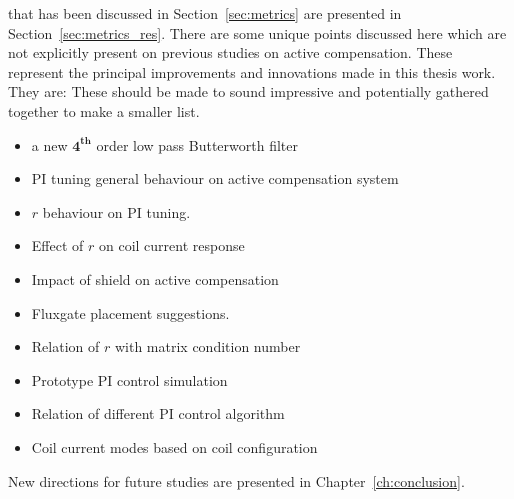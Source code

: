 that has been discussed in Section~\ref{sec:metrics} are presented in
Section~\ref{sec:metrics_res}. There are some unique points discussed
here which are not explicitly present on previous studies on active
compensation. These represent the principal improvements and
innovations made in this thesis work.  They are: {\color{red}These
should be made to sound impressive and potentially gathered together
to make a smaller list.}
\begin{itemize}
    \item a new $\mathbf{4^{th}}$ order low pass Butterworth filter
    \item PI tuning general behaviour on active compensation system 
    \item $r$ behaviour on PI tuning.
    \item Effect of $r$ on coil current response
    \item Impact of shield on active compensation
    \item Fluxgate placement suggestions.
    \item Relation of $r$ with matrix condition number
    \item Prototype PI control simulation
    \item Relation of different PI control algorithm
    \item Coil current modes based on coil configuration
\end{itemize}
New directions for future studies are presented in
Chapter~\ref{ch:conclusion}.




